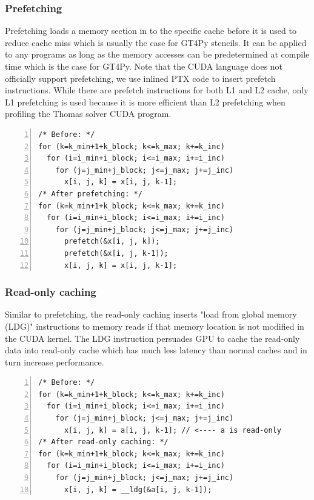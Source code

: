 \documentclass[]{article}
\begin{document}
\subsubsection{Prefetching}
Prefetching loads a memory section in to the specific cache before it is used to reduce cache miss which is usually the case for GT4Py stencils. It can be applied to any programs as long as the memory accesses can be predetermined at compile time which is the case for GT4Py. Note that the CUDA language does not officially support prefetching, we use inlined PTX code to insert prefetch instructions. While there are prefetch instructions for both L1 and L2 cache, only L1 prefetching is used because it is more efficient than L2 prefetching when profiling the Thomas solver CUDA program.
\begin{Verbatim}[frame=lines,numbers=left,label=Prefetching,framesep=3mm]
/* Before: */
for (k=k_min+1+k_block; k<=k_max; k+=k_inc)
  for (i=i_min+i_block; i<=i_max; i+=i_inc)
    for (j=j_min+j_block; j<=j_max; j+=j_inc)
      x[i, j, k] = x[i, j, k-1];
/* After prefetching: */
for (k=k_min+1+k_block; k<=k_max; k+=k_inc)
  for (i=i_min+i_block; i<=i_max; i+=i_inc)
    for (j=j_min+j_block; j<=j_max; j+=j_inc)
      prefetch(&x[i, j, k]);
      prefetch(&x[i, j, k-1]);
      x[i, j, k] = x[i, j, k-1];
\end{Verbatim}
\subsubsection{Read-only caching}
Similar to prefetching, the read-only caching inserts "load from global memory (LDG)" instructions to memory reads if that memory location is not modified in the CUDA kernel. The LDG instruction persuades GPU to cache the read-only data into read-only cache which has much less latency than normal caches and in turn increase performance.
\begin{Verbatim}[frame=lines,numbers=left,label=Read-only caching,framesep=3mm]
/* Before: */
for (k=k_min+1+k_block; k<=k_max; k+=k_inc)
  for (i=i_min+i_block; i<=i_max; i+=i_inc)
    for (j=j_min+j_block; j<=j_max; j+=j_inc)
      x[i, j, k] = a[i, j, k-1]; // <---- a is read-only
/* After read-only caching: */
for (k=k_min+1+k_block; k<=k_max; k+=k_inc)
  for (i=i_min+i_block; i<=i_max; i+=i_inc)
    for (j=j_min+j_block; j<=j_max; j+=j_inc)
      x[i, j, k] = __ldg(&a[i, j, k-1]);
\end{Verbatim}
\end{document}

